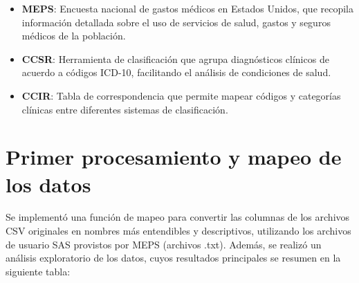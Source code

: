 \documentclass[12pt,a4paper]{article}
\begin{document}
\begin{itemize}
    \item \textbf{MEPS}: Encuesta nacional de gastos médicos en Estados Unidos, que recopila información detallada sobre el uso de servicios de salud, gastos y seguros médicos de la población.
    \item \textbf{CCSR}: Herramienta de clasificación que agrupa diagnósticos clínicos de acuerdo a códigos ICD-10, facilitando el análisis de condiciones de salud.
    \item \textbf{CCIR}: Tabla de correspondencia que permite mapear códigos y categorías clínicas entre diferentes sistemas de clasificación.
\end{itemize}


\section*{Primer procesamiento y mapeo de los datos}

Se implementó una función de mapeo para convertir las columnas de los archivos CSV originales en nombres más entendibles y descriptivos, utilizando los archivos de usuario SAS provistos por MEPS (archivos .txt). Además, se realizó un análisis exploratorio de los datos, cuyos resultados principales se resumen en la siguiente tabla:
\end{document}
